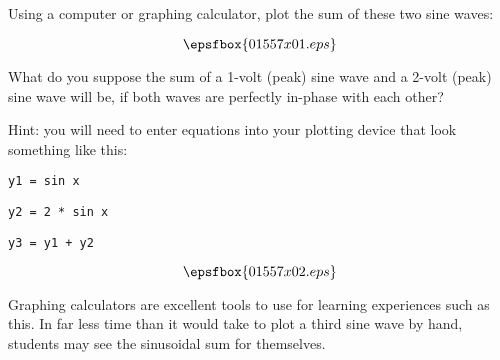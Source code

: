 

Using a computer or graphing calculator, plot the sum of these two sine waves:

$$\epsfbox{01557x01.eps}$$

What do you suppose the sum of a 1-volt (peak) sine wave and a 2-volt (peak) sine wave will be, if both waves are perfectly in-phase with each other?

\vskip 10pt

Hint: you will need to enter equations into your plotting device that look something like this:

\vskip 10pt

{\tt y1 = sin x}

\vskip 10pt

{\tt y2 = 2 * sin x}

\vskip 10pt

{\tt y3 = y1 + y2}

\vskip 10pt







$$\epsfbox{01557x02.eps}$$







Graphing calculators are excellent tools to use for learning experiences such as this.  In far less time than it would take to plot a third sine wave by hand, students may see the sinusoidal sum for themselves.




